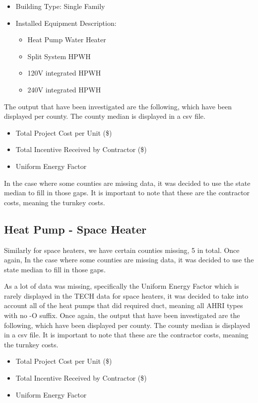 \documentclass{article}
\begin{document}
\begin{itemize}
    \item Building Type: Single Family
    \item Installed Equipment Description: 
    \begin{itemize}
        \item Heat Pump Water Heater
        \item Split System HPWH
        \item 120V integrated HPWH
        \item 240V integrated HPWH
    \end{itemize}
\end{itemize}

The output that have been investigated are the following, which have been displayed per county. The county median is displayed in a csv file.

\begin{itemize}
    \item Total Project Cost per Unit (\$)
    \item Total Incentive Received by Contractor (\$)
    \item Uniform Energy Factor
\end{itemize}

In the case where some counties are missing data, it was decided to use the state median to fill in those gaps. It is important to note that these are the contractor costs, meaning the turnkey costs.

\subsection{Heat Pump - Space Heater}

Similarly for space heaters, we have certain counties missing, 5 in total. Once again, In the case where some counties are missing data, it was decided to use the state median to fill in those gaps. 

As a lot of data was missing, specifically the Uniform Energy Factor which is rarely displayed in the TECH data for space heaters, it was decided to take into account all of the heat pumps that did required duct, meaning all AHRI types with no -O suffix. Once again, the output that have been investigated are the following, which have been displayed per county. The county median is displayed in a csv file. It is important to note that these are the contractor costs, meaning the turnkey costs.

\begin{itemize}
    \item Total Project Cost per Unit (\$)
    \item Total Incentive Received by Contractor (\$)
    \item Uniform Energy Factor
\end{itemize}
\end{document}
